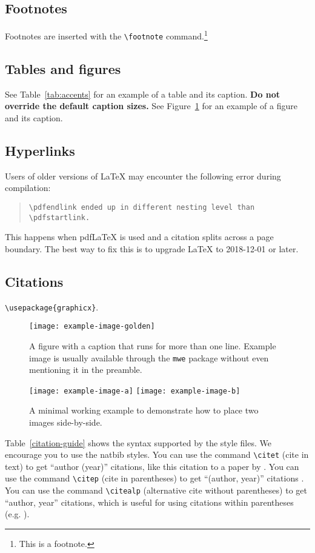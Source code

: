 \documentclass[11pt]{article}
\begin{document}
\subsection{Footnotes}

Footnotes are inserted with the \verb|\footnote| command.\footnote{This is a footnote.}

\subsection{Tables and figures}  

See Table~\ref{tab:accents} for an example of a table and its caption.
\textbf{Do not override the default caption sizes.}
 See Figure~\ref{fig:experiments} for an example of a figure and its caption.
\subsection{Hyperlinks}

Users of older versions of \LaTeX{} may encounter the following error during compilation: 
\begin{quote}
\tt\verb|\pdfendlink| ended up in different nesting level than \verb|\pdfstartlink|.
\end{quote}
This happens when pdf\LaTeX{} is used and a citation splits across a page boundary. The best way to fix this is to upgrade \LaTeX{} to 2018-12-01 or later.

\subsection{Citations}

\verb|\usepackage{graphicx}|.

\begin{figure}[t]
  \texttt{[image: example-image-golden]}
  \caption{A figure with a caption that runs for more than one line.
    Example image is usually available through the \texttt{mwe} package
    without even mentioning it in the preamble.}
  \label{fig:experiments}
\end{figure}

\begin{figure*}[t]
  \texttt{[image: example-image-a]} \hfill
  \texttt{[image: example-image-b]}
  \caption {A minimal working example to demonstrate how to place
    two images side-by-side.}
\end{figure*}

Table~\ref{citation-guide} shows the syntax supported by the style files.
We encourage you to use the natbib styles.
You can use the command \verb|\citet| (cite in text) to get ``author (year)'' citations, like this citation to a paper by \citet{Gusfield:97}.
You can use the command \verb|\citep| (cite in parentheses) to get ``(author, year)'' citations \citep{Gusfield:97}.
You can use the command \verb|\citealp| (alternative cite without parentheses) to get ``author, year'' citations, which is useful for using citations within parentheses (e.g. \citealp{Gusfield:97}).
\end{document}
